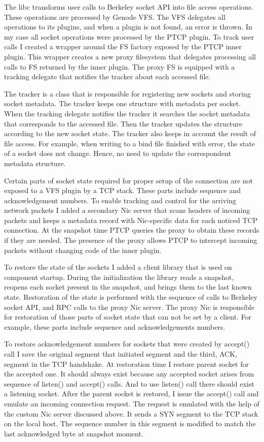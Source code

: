 The libc transforms user calls to Berkeley socket API into file access
operations. These operations are processed by Genode VFS. The VFS delegates all
operations to its plugins, and when a plugin is not found, an error is thrown.
In my case all socket operations were processed by the PTCP plugin. To track
user calls I created a wrapper around the FS factory exposed by the PTCP inner
plugin. This wrapper creates a new proxy filesystem that delegates processing
all calls to FS returned by the inner plugin. The proxy FS is equipped with a
tracking delegate that notifies the tracker about each accessed file.

The tracker is a class that is responsible for registering new sockets and
storing socket metadata. The tracker keeps one structure with metadata per
socket. When the tracking delegate notifies the tracker it searches the
socket metadata that corresponds to the accessed file. Then the tracker
updates the structure according to the new socket state. The tracker also keeps
in account the result of file access. For example, when writing to a bind file
finished with error, the state of a socket does not change. Hence, no need to
update the correspondent metadata structure.

Certain parts of socket state required for proper setup of the connection are
not exposed to a VFS plugin by a TCP stack. These parts include sequence and
acknowledgement numbers. To enable tracking and control for the arriving
network packets I added a secondary Nic server that scans headers of incoming
packets and keeps a metadata record with Nic-specific data for each noticed TCP
connection. At the snapshot time PTCP queries the proxy to obtain these records
if they are needed. The presence of the proxy allows PTCP to intercept
incoming packets without changing code of the inner plugin. 

To restore the state of the sockets I added a client library that is used on
component startup. During the initialization the library reads a snapshot,
reopens each socket present in the snapshot, and brings them to the last known
state. Restoration of the state is performed with the sequence of calls to
Berkeley socket API, and RPC calls to the proxy Nic server. The proxy Nic is
responsible for restoration of those parts of socket state that can not be set
by a client. For example, these parts include sequence and acknowledgements
numbers. 

To restore acknowledgement numbers for sockets that were created by accept()
call I save the original segment that initiated segment and the third, ACK,
segment in the TCP handshake. At restoration time I restore parent socket for
the accepted one. It should always exist because any accepted socket arises from
sequence of listen() and accept() calls. And to use listen() call there should
exist a listening socket. After the parent socket is restored, I issue the
accept() call and emulate an incoming connection request. The request is
emulated with the help of the custom Nic server discussed above. It sends a SYN
segment to the TCP stack on the local host. The sequence number in this segment
is modified to match the last acknowledged byte at snapshot moment.

